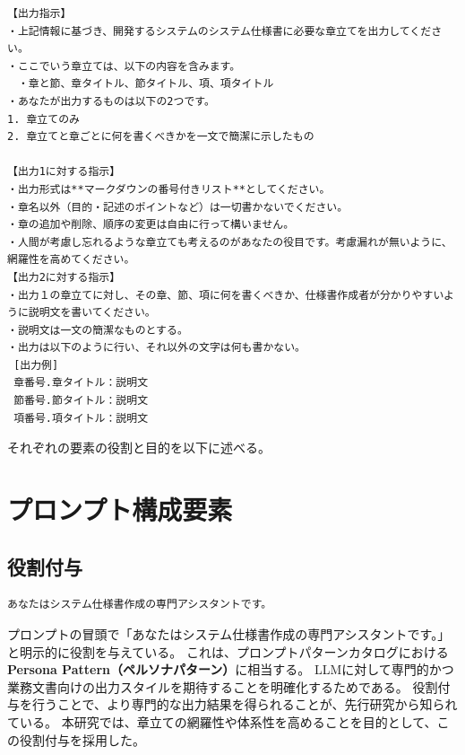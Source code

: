 \begin{tcolorbox}[
  colback=white,
  colframe=black,
  title=本研究で作成したプロンプト,
  fonttitle=\bfseries,
  breakable
]
\begin{verbatim}
【出力指示】
・上記情報に基づき、開発するシステムのシステム仕様書に必要な章立てを出力してください。
・ここでいう章立ては、以下の内容を含みます。
　・章と節、章タイトル、節タイトル、項、項タイトル
・あなたが出力するものは以下の2つです。
1. 章立てのみ
2. 章立てと章ごとに何を書くべきかを一文で簡潔に示したもの

【出力1に対する指示】 
・出力形式は**マークダウンの番号付きリスト**としてください。 
・章名以外（目的・記述のポイントなど）は一切書かないでください。 
・章の追加や削除、順序の変更は自由に行って構いません。
・人間が考慮し忘れるような章立ても考えるのがあなたの役目です。考慮漏れが無いように、網羅性を高めてください。
【出力2に対する指示】
・出力１の章立てに対し、その章、節、項に何を書くべきか、仕様書作成者が分かりやすいように説明文を書いてください。
・説明文は一文の簡潔なものとする。
・出力は以下のように行い、それ以外の文字は何も書かない。
 [出力例]
 章番号.章タイトル：説明文
 節番号.節タイトル：説明文
 項番号.項タイトル：説明文
\end{verbatim}
\end{tcolorbox}
\par\vspace{-20pt}
\label{fig:development_system_info_overview}

それぞれの要素の役割と目的を以下に述べる。

\section{プロンプト構成要素}

\subsection{役割付与}

\begin{tcolorbox}[
  colback=white,
  colframe=black,
  fonttitle=\bfseries,
  breakable
]
\footnotesize
\ttfamily
\fontsize{11}{12}\selectfont
\begin{verbatim}
あなたはシステム仕様書作成の専門アシスタントです。
\end{verbatim}
\end{tcolorbox}
\par\vspace{-20pt}
\label{fig:role_assignment}
プロンプトの冒頭で「あなたはシステム仕様書作成の専門アシスタントです。」と明示的に役割を与えている。
これは、プロンプトパターンカタログにおける\textbf{Persona Pattern（ペルソナパターン）}\cite{prompt-engineering}に相当する。
LLMに対して専門的かつ業務文書向けの出力スタイルを期待することを明確化するためである。
役割付与を行うことで、より専門的な出力結果を得られることが、先行研究から知られている\cite{role_assignment}。
本研究では、章立ての網羅性や体系性を高めることを目的として、この役割付与を採用した。
